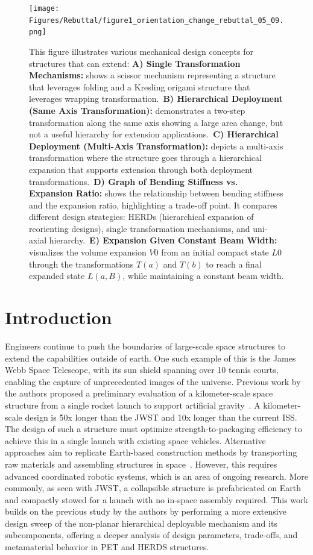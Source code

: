 \begin{figure}
\centering
\texttt{[image: Figures/Rebuttal/figure1\_orientation\_change\_rebuttal\_05\_09.png]}
\centering
\caption{This figure illustrates various mechanical design concepts for structures that can extend: \textbf{A) Single Transformation Mechanisms:} shows a scissor mechanism representing a structure that leverages folding and a Kresling origami structure that leverages wrapping transformation.~\textbf{B) Hierarchical Deployment (Same Axis Transformation):} demonstrates a two-step transformation along the same axis showing a large area change, but not a useful hierarchy for extension applications.~\textbf{C) Hierarchical Deployment (Multi-Axis Transformation):} depicts a multi-axis transformation where the structure goes through a hierarchical expansion that supports extension through both deployment transformations.~\textbf{D) Graph of Bending Stiffness vs. Expansion Ratio:} shows the relationship between bending stiffness and the expansion ratio, highlighting a trade-off point. It compares different design strategies: HERDs (hierarchical expansion of reorienting designs), single transformation mechanisms, and uni-axial hierarchy.~\textbf{E) Expansion Given Constant Beam Width:} visualizes the volume expansion \(V0\) from an initial compact state $L0$ through the transformations $T(a)$ and $T(b)$ to reach a final expanded state $L(a, B)$, while maintaining a constant beam width.}\label{fig:expansion}
\end{figure}

\section{Introduction}\label{sec:herds:introduction}
{Engineers continue to push the boundaries of large-scale space structures to extend the capabilities outside of earth. One such example of this is the James Webb Space Telescope, with its sun shield spanning over 10 tennis courts, enabling the capture of unprecedented images of the universe. Previous work by the authors proposed a preliminary evaluation of a kilometer-scale space structure from a single rocket launch to support artificial gravity~\cite{fogelson2024herds}. A kilometer-scale design is 50x longer than the JWST and 10x longer than the current ISS. The design of such a structure must optimize strength-to-packaging efficiency to achieve this in a single launch with existing space vehicles. Alternative approaches aim to replicate Earth-based construction methods by transporting raw materials and assembling structures in space~\cite{xue_review_2021}. However, this requires advanced coordinated robotic systems, which is an area of ongoing research. More commonly, as seen with JWST, a collapsible structure is prefabricated on Earth and compactly stowed for a launch with no in-space assembly required. This work builds on the previous study by the authors \cite{fogelson2024herds} by performing a more extensive design sweep of the non-planar hierarchical deployable mechanism and its subcomponents, offering a deeper analysis of design parameters, trade-offs, and metamaterial behavior in PET and HERDS structures.}

